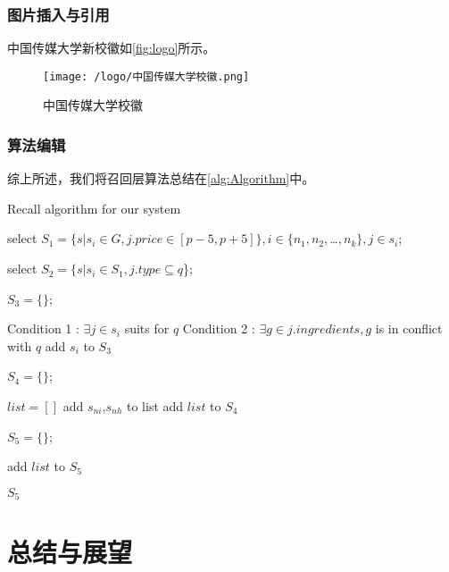 \subsection{图片插入与引用}
中国传媒大学新校徽如\autoref{fig:logo}所示。
\begin{figure}[htbp]
    \centering
    \texttt{[image: /logo/中国传媒大学校徽.png]}
    \caption{\label{fig:logo}中国传媒大学校徽}
\end{figure}

\subsection{算法编辑}
综上所述，我们将召回层算法总结在\autoref{alg:Algorithm}中。
\begin{algorithm}  
    \caption{Recall algorithm for our system}
    \label{alg:Algorithm}
    
    select $S_1 = \{s|s_i \in {G}, j.price \in [p-5, p+5] \}, i \in \{n_1,n_2,$…$,n_k\} , j \in s_i$;   
    
    select $S_2 = \{s|s_i \in {S_1}, j.type  \subseteq q $\}; 
    
    $S_3=\{\}$;
    
    {
      Condition 1 : $\exists j \in s_i$ suits for $q$\;
      Condition 2 : $\exists g \in j.ingredients, g$ is in conflict with $q$\;
      {
        add $s_i$ to $S_3$\;
      }
    }

    $S_4=\{\}$;

    {
       $list = []$ \;
      {
        {
          {
            add $s_{ni}$,$s_{nh}$ to list\;
          }
        }
      }
      add $list$ to $S_4$\;
    }

    $S_5=\{\}$;

    {
        {
            add $list$ to $S_5$\;
        }
    }

    \Return $S_5$\;  
\end{algorithm}  

\chapter{总结与展望}
